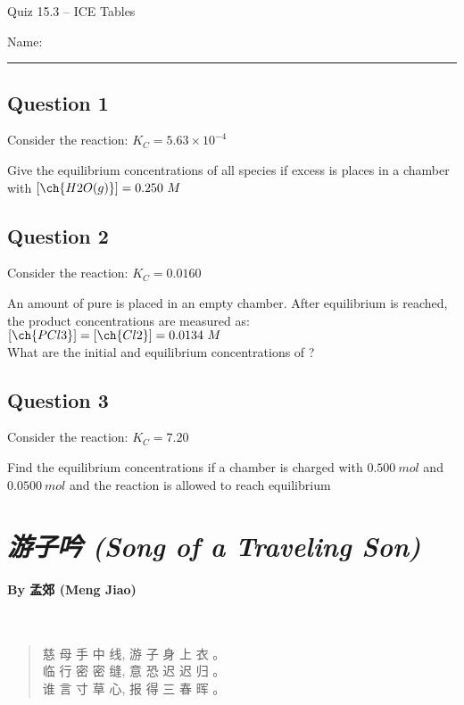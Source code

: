 \documentclass[11pt, letterpaper]{memoir}
\begin{document}
	\begin{center}
		{\large	Quiz 15.3 -- ICE Tables}
	\end{center}
	{\large Name: \rule[-1mm]{4in}{.1pt} 
	
	\subsection*{Question 1}
	Consider the reaction:  \hspace{1em} $K_C=5.63\times10^{-4}$ 
	
	\noindent Give the equilibrium concentrations of all species if excess  is places in a chamber with $\left[\ch{H2O(g)}\right]=0.250~M$
	
	\vspace{9em}
	\subsection*{Question 2}
	Consider the reaction:  \hspace{1em} $K_C=0.0160$
	
	\noindent An amount of pure  is placed in an empty chamber. After equilibrium is reached, the product concentrations are measured as: $\left[\ch{PCl3}\right]=\left[\ch{Cl2}\right]=0.0134~M$ \\What are the initial and equilibrium concentrations of ?
	
	\vspace{9em}
	\subsection*{Question 3}
	Consider the reaction:  \hspace{1em} $K_C=7.20$
	
	\noindent Find the equilibrium concentrations if a chamber is charged with $0.500~mol$  and $0.0500~mol$  and the reaction is allowed to reach equilibrium
	\newpage
	\pagestyle{empty}
	\addtocounter{page}{-1}
	\section*{\emph{{游子吟} (Song of a Traveling Son)}}
	\paragraph{By {孟郊} (Meng Jiao)}~
	{
		\begin{verse}	
			慈 母 手 中 线, 游 子 身 上 衣 。\\
			临 行 密 密 缝, 意 恐 迟 迟 归 。\\
			谁 言 寸 草 心, 报 得 三 春 晖 。
		\end{verse}
	}
	
}
\end{document}
